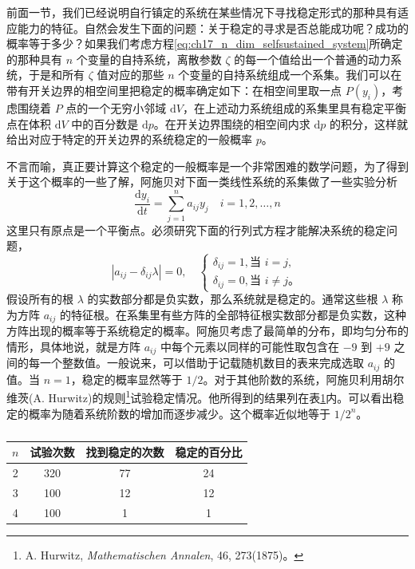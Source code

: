 前面一节，我们已经说明自行镇定的系统在某些情况下寻找稳定形式的那种具有适应能力的特征。自然会发生下面的问题：关于稳定的寻求是否总能成功呢？成功的概率等于多少？如果我们考虑方程\eqref{eq:ch17_n_dim_selfsustained_system}所确定的那种具有 $n$ 个变量的自持系统，离散参数 $\zeta$ 的每一个值给出一个普通的动力系统，于是和所有 $\zeta$ 值对应的那些 $n$ 个变量的自持系统组成一个系集。我们可以在带有开关边界的相空间里把稳定的概率确定如下：在相空间里取一点 $P(y_i)$，考虑围绕着 $P$ 点的一个无穷小邻域 $\mathrm{d}V$，在上述动力系统组成的系集里具有稳定平衡点在体积 $\mathrm{d}V$ 中的百分数是 $\mathrm{d}p$。在开关边界围绕的相空间内求 $\mathrm{d}p$ 的积分，这样就给出对应于特定的开关边界的系统稳定的一般概率 $p$。

不言而喻，真正要计算这个稳定的一般概率是一个非常困难的数学问题，为了得到关于这个概率的一些了解，阿施贝对下面一类线性系统的系集做了一些实验分析
\begin{equation}
\frac{\mathrm{d}y_i}{\mathrm{d}t} = \sum_{j=1}^{n} a_{ij}y_j \quad i=1,2,\dots,n
\label{eq:ch17_linear_n_order_system}
\end{equation}
这里只有原点是一个平衡点。必须研究下面的行列式方程才能解决系统的稳定问题，
\begin{equation}
\left| a_{ij} - \delta_{ij}\lambda \right| = 0,\quad
\begin{cases}
\delta_{ij} = 1,\text{当 }i=j,\\
\delta_{ij} = 0,\text{当 }i\neq j。
\end{cases}
\label{eq:ch17_characteristic_det_eq}
\end{equation}
假设所有的根 $\lambda$ 的实数部分都是负实数，那么系统就是稳定的。通常这些根 $\lambda$ 称为方阵 $a_{ij}$ 的特征根。在系集里有些方阵的全部特征根实数部分都是负实数，这种方阵出现的概率等于系统稳定的概率。阿施贝考虑了最简单的分布，即均匀分布的情形，具体地说，就是方阵 $a_{ij}$ 中每个元素以同样的可能性取包含在 $-9$ 到 $+9$ 之间的每一个整数值。一般说来，可以借助于记载随机数目的表来完成选取 $a_{ij}$ 的值。当 $n=1$，稳定的概率显然等于 $1/2$。对于其他阶数的系统，阿施贝利用胡尔维茨(A. Hurwitz)的规则\footnote{A. Hurwitz, \textit{Mathematischen Annalen}, 46, 273(1875)。}试验稳定情况。他所得到的结果列在表\ref{table_17_1}内。可以看出稳定的概率为随着系统阶数的增加而逐步减少。这个概率近似地等于 $1/2^n$。


\begin{table}
\centering
\caption{}     
\label{table_17_1}
\begin{tabular}{cccc}
\toprule
$n$ & 试验次数 & 找到稳定的次数 & 稳定的百分比 \\
\midrule
2 & 320 & 77 & 24 \\
3 & 100 & 12 & 12 \\
4 & 100 & 1 & 1 \\
\bottomrule
\end{tabular}
\end{table}


